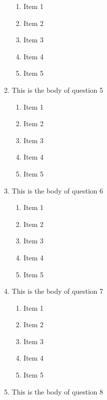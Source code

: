 \documentclass[amsfonts,bezier,leqno,fleqn,12pt,a4paper]{article}
\begin{document}
\begin{large}
\begin{enumerate}
\begin{enumerate}
\item Item 1
\item Item 2
\item Item 3
\item Item 4
\item Item 5

\end{enumerate}
\newpage


\item This is the body of question 5
\vspace {0.3in}
\setcounter{equation}{0}

\begin{enumerate}
\item Item 1
\item Item 2
\item Item 3
\item Item 4
\item Item 5

\end{enumerate}

\vspace {3.5cm}


\item This is the body of question 6
\vspace {0.3in}
\setcounter{equation}{0}

\begin{enumerate}
\item Item 1
\item Item 2
\item Item 3
\item Item 4
\item Item 5

\end{enumerate}
\newpage


\item This is the body of question 7
\vspace {0.3in}
\setcounter{equation}{0}

\begin{enumerate}
\item Item 1
\item Item 2
\item Item 3
\item Item 4
\item Item 5

\end{enumerate}

\vspace {3.5cm}


\item This is the body of question 8
\vspace {0.3in}
\setcounter{equation}{0}


\end{enumerate}
\end{large}
\end{document}
